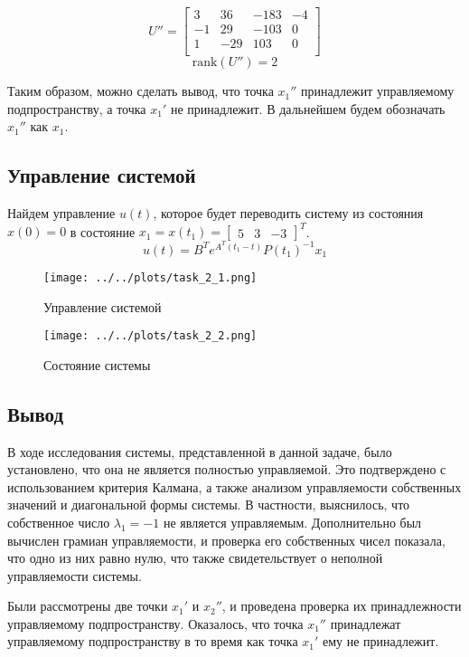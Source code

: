 \begin{equation}
   U'' = \begin{bmatrix}
        3 & 36 & -183 & -4 \\ 
        -1 & 29 & -103 & 0 \\ 
        1 & -29 & 103 & 0 \\
    \end{bmatrix}
\end{equation}
\begin{equation}
    \text{rank}(U'') = 2
\end{equation}

Таким образом, можно сделать вывод, что точка $x_1''$ принадлежит управляемому подпространству, а точка $x_1'$ не принадлежит. В дальнейшем будем обозначать $x_1''$ как $x_1$.

\subsection{Управление системой}
Найдем управление $u(t)$, которое будет переводить систему из состояния $x(0) = 0$ в состояние $x_1 = x(t_1) = \begin{bmatrix} 5 & 3 & -3 \end{bmatrix}^T$. 
\begin{equation}
    u(t) = B^Te^{A^T(t_1 - t)}P(t_1)^{-1}x_1
\end{equation}

\begin{figure}[H]
    \centering
    \texttt{[image: ../../plots/task\_2\_1.png]}
    \caption{Управление системой}
    \label{fig:task2_control_signal}
\end{figure}

\begin{figure}[H]
    \centering
    \texttt{[image: ../../plots/task\_2\_2.png]}
    \caption{Состояние системы}
    \label{fig:task2_state}
\end{figure}

\subsection{Вывод}
В ходе исследования системы, представленной в данной задаче, было установлено, 
что она не является полностью управляемой. 
Это подтверждено с использованием критерия Калмана, 
а также анализом управляемости собственных значений и диагональной формы системы. 
В частности, выяснилось, что собственное число $\lambda_1 = -1$ не является 
управляемым. Дополнительно был вычислен грамиан управляемости, 
и проверка его собственных чисел показала, что одно из них равно нулю, 
что также свидетельствует о неполной управляемости системы.

Были рассмотрены две точки $x_1'$ и $x_2''$, и проведена проверка их принадлежности 
управляемому подпространству. Оказалось, что точка $x_1''$ принадлежат управляемому подпространству
в то время как точка $x_1'$ ему не принадлежит. 